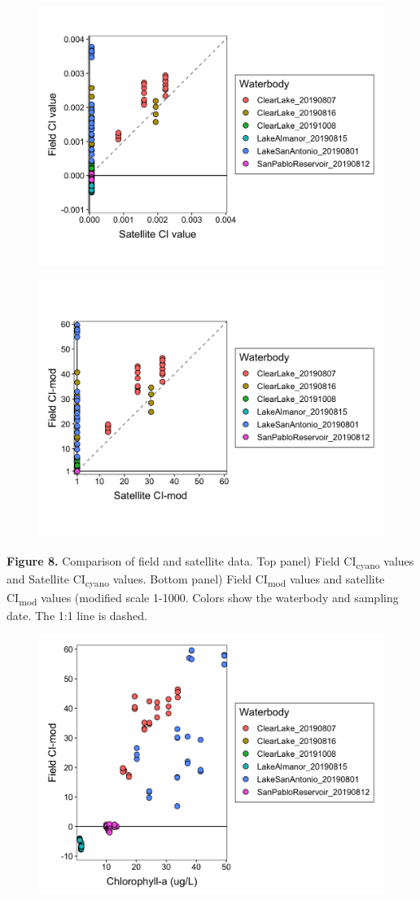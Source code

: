 \documentclass[]{article}
\begin{document}
\begin{figure}
\includegraphics[width=0.5\linewidth]{../Data/Figures_output/ci_fs} \end{figure}\begin{figure}
\includegraphics[width=0.5\linewidth]{../Data/Figures_output/ci_mod_fs} \end{figure}

\textbf{Figure 8.} Comparison of field and satellite data. Top panel)
Field CI\textsubscript{cyano} values and Satellite
CI\textsubscript{cyano} values. Bottom panel) Field
CI\textsubscript{mod} values and satellite CI\textsubscript{mod} values
(modified scale 1-1000. Colors show the waterbody and sampling date. The
1:1 line is dashed.

\begin{figure}

{\centering \includegraphics[width=0.6\linewidth]{../Data/Figures_output/ci_mod_chla} 

}

\end{figure}
\end{document}
